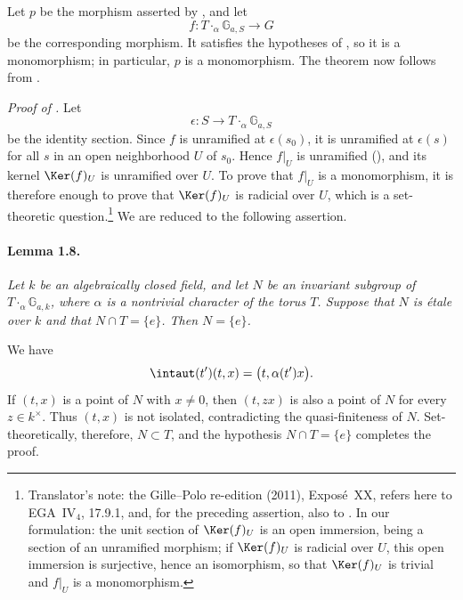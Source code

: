 Let \(p\) be the morphism asserted by , and let
\[
  f\colon T\mathbin{\cdot_\alpha}\mathbb G_{a,S}\longrightarrow G
\]
be the corresponding morphism. It satisfies the hypotheses of ,
so it is a monomorphism; in particular, \(p\) is a monomorphism.
The theorem now follows from .

\medskip
\noindent\emph{Proof of .}
Let
\[
  \epsilon\colon S\longrightarrow
    T\mathbin{\cdot_\alpha}\mathbb G_{a,S}
\]
be the identity section. Since \(f\) is unramified at
\(\epsilon(s_0)\), it is unramified at \(\epsilon(s)\) for all
\(s\) in an open neighborhood \(U\) of \(s_0\). Hence \(f|_U\) is
unramified \textup{()}, and its kernel \(\Ker(f)_U\) is unramified over
\(U\). To prove that \(f|_U\) is a monomorphism, it is therefore
enough to prove that
\(\Ker(f)_U\) is radicial over \(U\), which is a set-theoretic
question.\footnote{Translator's note: the Gille--Polo re-edition (2011), Exposé~XX, refers here to EGA~IV\(_4\), 17.9.1, and, for the
preceding assertion, also to . In
our formulation: the unit section of \(\Ker(f)_U\) is an open immersion, being a section of an
unramified morphism; if \(\Ker(f)_U\) is radicial over \(U\), this open immersion is surjective,
hence an isomorphism, so that \(\Ker(f)_U\) is trivial and \(f|_U\) is a monomorphism.}
We are reduced to the following assertion.

\paragraph{\textbf{Lemma 1.8.}}
\emph{Let \(k\) be an algebraically closed field, and let \(N\) be
an invariant subgroup of
\(T\mathbin{\cdot_\alpha}\mathbb G_{a,k}\), where \(\alpha\) is a
nontrivial character of the torus \(T\). Suppose that \(N\) is
étale over \(k\) and that \(N\cap T=\{e\}\). Then \(N=\{e\}\).}

We have
\[
  \intaut(t')(t,x)=\bigl(t,\alpha(t')x\bigr).
\]
If \((t,x)\) is a point of \(N\) with \(x\neq0\), then
\((t,zx)\) is also a point of \(N\) for every \(z\in k^\times\).
Thus \((t,x)\) is not isolated, contradicting the quasi-finiteness
of \(N\). Set-theoretically, therefore, \(N\subset T\), and the
hypothesis \(N\cap T=\{e\}\) completes the proof.
